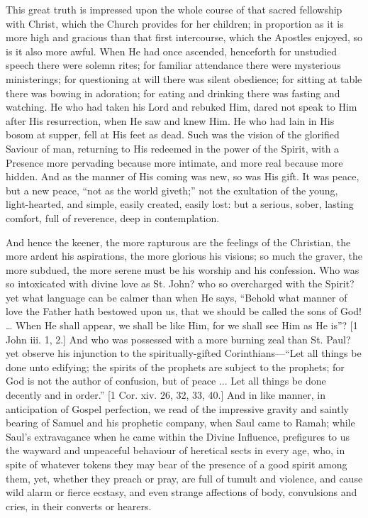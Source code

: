This great truth is impressed upon the whole course of that sacred
fellowship with Christ, which the Church provides for her children; in
proportion as it is more high and gracious than that first
intercourse, which the Apostles enjoyed, so is it also more awful.
When He had once ascended, henceforth for unstudied speech there were
solemn rites; for familiar attendance there were mysterious
ministerings; for questioning at will there was silent obedience; for
sitting at table there was bowing in adoration; for eating and
drinking there was fasting and watching. He who had taken his Lord and
rebuked Him, dared not speak to Him after His resurrection, when He
saw and knew Him. He who had lain in His bosom at supper, fell at His
feet as dead. Such was the vision of the glorified Saviour of man,
returning to His redeemed in the power of the Spirit, with a Presence
more pervading because more intimate, and more real because more
hidden. And as the manner of His coming was new, so was His gift. It
was peace, but a new peace, ``not as the world giveth;'' not
the exultation of the young, light-hearted, and simple, easily
created, easily lost: but a serious, sober, lasting comfort, full of
reverence, deep in contemplation.

And hence the keener, the more rapturous are the feelings of the
Christian, the more ardent his aspirations, the more glorious his
visions; so much the graver, the more subdued, the more serene must be
his worship and his confession. Who was so intoxicated with divine
love as St. John? who so overcharged with the Spirit? yet what
language can be calmer than when He says, ``Behold what manner of
love the Father hath bestowed upon us, that we should be called the
sons of God! … When He shall appear, we shall be like Him, for we
shall see Him as He is''? [1 John iii. 1, 2.] And who was
possessed with a more burning zeal than St. Paul? yet observe his
injunction to the spiritually-gifted Corinthians—``Let all
things be done unto edifying; the spirits of the prophets are subject
to the prophets; for God is not the author of confusion, but of peace
... Let all things be done decently and in order.'' [1 Cor. xiv.
26, 32, 33, 40.] And in like manner, in anticipation of Gospel
perfection, we read of the impressive gravity and saintly bearing of
Samuel and his prophetic company, when Saul came to Ramah; while
Saul's extravagance when he came within the Divine Influence,
prefigures to us the wayward and unpeaceful behaviour of heretical
sects in every age, who, in spite of whatever tokens they may bear of
the presence of a good spirit among them, yet, whether they preach or
pray, are full of tumult and violence, and cause wild alarm or fierce
ecstasy, and even strange affections of body, convulsions and cries,
in their converts or hearers.

